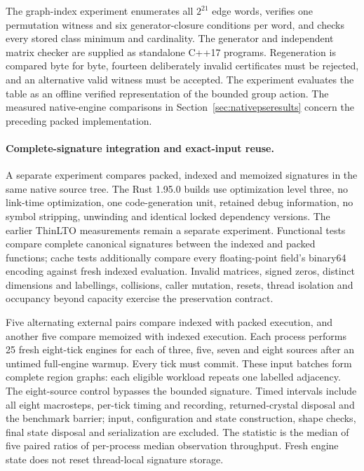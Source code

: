 \documentclass[11pt,a4paper]{article}
\theoremstyle{definition}\newtheorem{definition}[theorem]{Definition}
\begin{document}
The graph-index experiment enumerates all $2^{21}$ edge words, verifies one permutation witness and six generator-closure conditions per word, and checks every stored class minimum and cardinality. The generator and independent matrix checker are supplied as standalone C++17 programs. Regeneration is compared byte for byte, fourteen deliberately invalid certificates must be rejected, and an alternative valid witness must be accepted. The experiment evaluates the table as an offline verified representation of the bounded group action. The measured native-engine comparisons in Section~\ref{sec:nativepseresults} concern the preceding packed implementation.

\paragraph{Complete-signature integration and exact-input reuse.}
A separate experiment compares packed, indexed and memoized signatures in the same native source tree. The Rust 1.95.0 builds use optimization level three, no link-time optimization, one code-generation unit, retained debug information, no symbol stripping, unwinding and identical locked dependency versions. The earlier ThinLTO measurements remain a separate experiment. Functional tests compare complete canonical signatures between the indexed and packed functions; cache tests additionally compare every floating-point field's binary64 encoding against fresh indexed evaluation. Invalid matrices, signed zeros, distinct dimensions and labellings, collisions, caller mutation, resets, thread isolation and occupancy beyond capacity exercise the preservation contract.

Five alternating external pairs compare indexed with packed execution, and another five compare memoized with indexed execution. Each process performs 25 fresh eight-tick engines for each of three, five, seven and eight sources after an untimed full-engine warmup. Every tick must commit. These input batches form complete region graphs: each eligible workload repeats one labelled adjacency. The eight-source control bypasses the bounded signature. Timed intervals include all eight macrosteps, per-tick timing and recording, returned-crystal disposal and the benchmark barrier; input, configuration and state construction, shape checks, final state disposal and serialization are excluded. The statistic is the median of five paired ratios of per-process median observation throughput. Fresh engine state does not reset thread-local signature storage.
\end{document}
